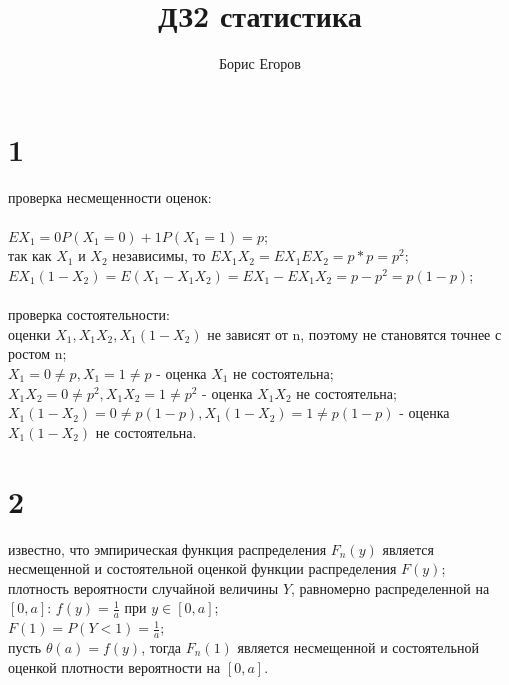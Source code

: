 \documentclass{article}
\author{Борис Егоров}
\title{ДЗ2 статистика}
\begin{document}
	\maketitle
	\begin{large}
	\section*{1}
	проверка несмещенности оценок:\\\\
	$EX_1=0P(X_1=0)+1P(X_1=1)=p$;\\
	так как $X_1$ и $X_2$ независимы, то $EX_1X_2=EX_1EX_2=p*p=p^2$;\\
	$EX_1(1-X_2)=E(X_1-X_1X_2)=EX_1-EX_1X_2=p-p^2=p(1-p)$;\\\\
	проверка состоятельности:\\
	оценки $X_1,X_1X_2,X_1(1-X_2)$ не зависят от n, поэтому не становятся точнее с ростом n;\\
	$X_1=0\ne p,X_1=1\ne p$ - оценка $X_1$ не состоятельна;\\
	$X_1X_2=0\ne p^2,X_1X_2=1\ne p^2$ - оценка $X_1X_2$ не состоятельна;\\
	$X_1(1-X_2)=0\ne p(1-p),X_1(1-X_2)=1\ne p(1-p)$ - оценка $X_1(1-X_2)$ не состоятельна.
	\section*{2}
	известно, что эмпирическая функция распределения $F_n(y)$ является несмещенной и состоятельной оценкой функции распределения $F(y)$;\\
	плотность вероятности случайной величины $Y$, равномерно распределенной на $[0,a]$: $f(y)=\frac{1}{a}$ при $y\in[0,a]$;\\
	$F(1)=P(Y<1)=\frac{1}{a}$;\\
	пусть $\theta(a)=f(y)$, тогда $F_n(1)$ является несмещенной и состоятельной оценкой плотности вероятности на $[0,a]$.

\end{large}
\end{document}
